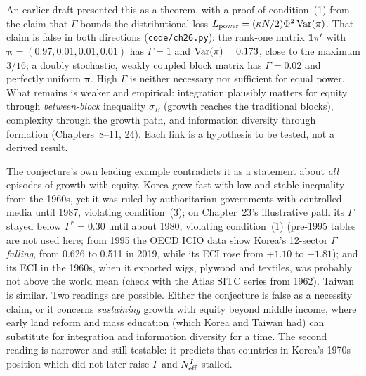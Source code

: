 \documentclass[../structural_economics_book.tex]{subfiles}
\begin{document}
\begin{remark}\label{ch26:rem:status}
An earlier draft presented this as a theorem, with a proof of condition~(1) from the claim that $\Gamma$ bounds the distributional loss $L_{\text{power}} = (\kappa N/2)\Phi^2\operatorname{Var}(\pi)$. That claim is false in both directions (\texttt{code/ch26.py}): the rank-one matrix $\mathbf{1}\pi'$ with $\boldsymbol{\pi} = (0.97, 0.01, 0.01, 0.01)$ has $\Gamma = 1$ and $\operatorname{Var}(\pi) = 0.173$, close to the maximum $3/16$; a doubly stochastic, weakly coupled block matrix has $\Gamma = 0.02$ and perfectly uniform $\boldsymbol{\pi}$. High $\Gamma$ is neither necessary nor sufficient for equal power. What remains is weaker and empirical: integration plausibly matters for equity through \emph{between-block} inequality $\sigma_B$ (growth reaches the traditional blocks), complexity through the growth path, and information diversity through formation (Chapters~8--11, 24). Each link is a hypothesis to be tested, not a derived result.
\end{remark}

\begin{remark}\label{ch26:rem:korea}
The conjecture's own leading example contradicts it as a statement about \emph{all} episodes of growth with equity. Korea grew fast with low and stable inequality from the 1960s, yet it was ruled by authoritarian governments with controlled media until 1987, violating condition~(3); on Chapter~23's illustrative path its $\Gamma$ stayed below $\Gamma^* = 0.30$ until about 1980, violating condition~(1) (pre-1995 tables are not used here; from 1995 the OECD ICIO data show Korea's 12-sector $\Gamma$ \emph{falling}, from 0.626 to 0.511 in 2019, while its ECI rose from $+1.10$ to $+1.81$); and its ECI in the 1960s, when it exported wigs, plywood and textiles, was probably not above the world mean (check with the Atlas SITC series from 1962). Taiwan is similar. Two readings are possible. Either the conjecture is false as a necessity claim, or it concerns \emph{sustaining} growth with equity beyond middle income, where early land reform and mass education (which Korea and Taiwan had) can substitute for integration and information diversity for a time. The second reading is narrower and still testable: it predicts that countries in Korea's 1970s position which did not later raise $\Gamma$ and $N_{\text{eff}}^I$ stalled.
\end{remark}
\end{document}
